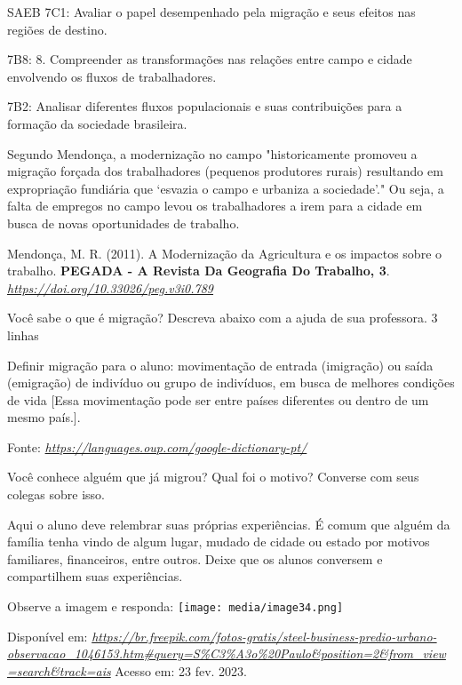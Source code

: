 SAEB 7C1: Avaliar o papel desempenhado pela migração e seus efeitos nas
regiões de destino.

7B8: 8. Compreender as transformações nas relações entre campo e cidade
envolvendo os fluxos de trabalhadores.

7B2: Analisar diferentes fluxos populacionais e suas contribuições para
a formação da sociedade brasileira.

Segundo Mendonça, a modernização no campo "historicamente promoveu a
migração forçada dos trabalhadores (pequenos produtores rurais)
resultando em expropriação fundiária que `esvazia o campo e urbaniza a
sociedade'." Ou seja, a falta de empregos no campo levou os
trabalhadores a irem para a cidade em busca de novas oportunidades de
trabalho.

Mendonça, M. R. (2011). A Modernização da Agricultura e os impactos
sobre o trabalho. \textbf{PEGADA - A Revista Da Geografia Do Trabalho,
3}.
\href{https://doi.org/10.33026/peg.v3i0.789}{\emph{https://doi.org/10.33026/peg.v3i0.789}}

Você sabe o que é migração? Descreva abaixo com a ajuda de sua
professora. 3 linhas

Definir migração para o aluno: movimentação de entrada (imigração) ou
saída (emigração) de indivíduo ou grupo de indivíduos, em busca de
melhores condições de vida {[}Essa movimentação pode ser entre países
diferentes ou dentro de um mesmo país.{]}.

Fonte:
\href{https://languages.oup.com/google-dictionary-pt/}{\emph{https://languages.oup.com/google-dictionary-pt/}}

Você conhece alguém que já migrou? Qual foi o motivo? Converse com seus
colegas sobre isso.

Aqui o aluno deve relembrar suas próprias experiências. É comum que
alguém da família tenha vindo de algum lugar, mudado de cidade ou estado
por motivos familiares, financeiros, entre outros. Deixe que os alunos
conversem e compartilhem suas experiências.

Observe a imagem e responda:
\texttt{[image: media/image34.png]}

Disponível em:
\href{https://br.freepik.com/fotos-gratis/steel-business-predio-urbano-observacao_1046153.htm\#query=S\%C3\%A3o\%20Paulo\&position=2\&from_view=search\&track=ais}{\emph{https://br.freepik.com/fotos-gratis/steel-business-predio-urbano-observacao\_1046153.htm\#query=S\%C3\%A3o\%20Paulo\&position=2\&from\_view=search\&track=ais}}
Acesso em: 23 fev. 2023.

